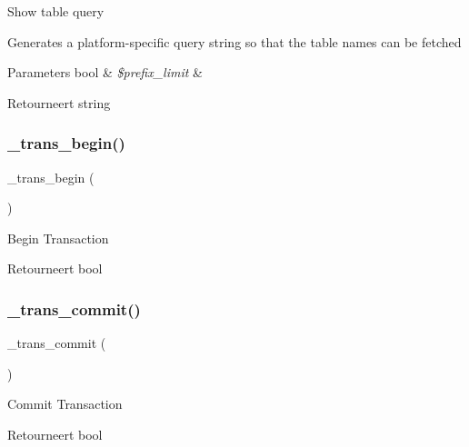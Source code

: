 Show table query

Generates a platform-\/specific query string so that the table names can be fetched


\begin{DoxyParams}[1]{Parameters}
bool & {\em \$prefix\+\_\+limit} & \\
\hline
\end{DoxyParams}
\begin{DoxyReturn}{Retourneert}
string 
\end{DoxyReturn}
\mbox{\label{class_c_i___d_b__odbc__driver_ac81ac882c1d54347d810199a15856aac}} 
\subsubsection{\texorpdfstring{\_trans\_begin()}{\_trans\_begin()}}
{\footnotesize\ttfamily \+\_\+trans\+\_\+begin (\begin{DoxyParamCaption}{ }\end{DoxyParamCaption})\hspace{0.3cm}{\ttfamily [protected]}}

Begin Transaction

\begin{DoxyReturn}{Retourneert}
bool 
\end{DoxyReturn}
\mbox{\label{class_c_i___d_b__odbc__driver_a6fe7f373e0b11cfae23a5f41c0b35dda}} 
\subsubsection{\texorpdfstring{\_trans\_commit()}{\_trans\_commit()}}
{\footnotesize\ttfamily \+\_\+trans\+\_\+commit (\begin{DoxyParamCaption}{ }\end{DoxyParamCaption})\hspace{0.3cm}{\ttfamily [protected]}}

Commit Transaction

\begin{DoxyReturn}{Retourneert}
bool 
\end{DoxyReturn}
\mbox{\label{class_c_i___d_b__odbc__driver_ad49a116b0776c26b53114c9093fd102a}} 
